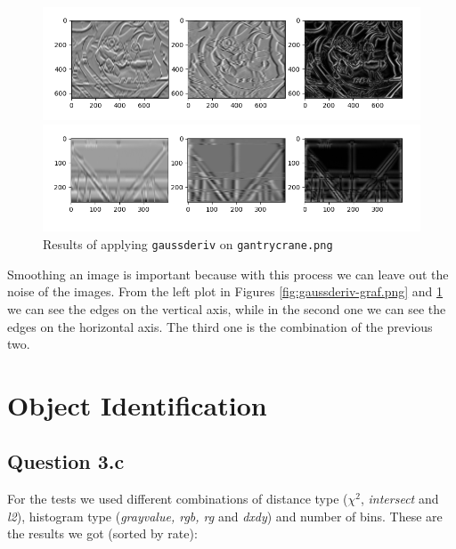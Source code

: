 \documentclass{article}
\begin{document}
\begin{figure}[ht]
    \centering
    \includegraphics[width=\textwidth]{images/Q1.e-graf-gaussderived.png}
    \cprotect\caption{Results of applying \verb|gaussderiv| on \verb|graf.png|}
    \label{fig:gaussderiv-graf.png}
    
    \includegraphics[width=\textwidth]{images/Q1.e-gantrycrane-gaussderived.png}
    \cprotect\caption{Results of applying \verb|gaussderiv| on \verb|gantrycrane.png|}
    \label{fig:gaussderiv-gantrycrane.png}
\end{figure}

\noindent
Smoothing an image is important because with this process we can leave out the noise of the images.
\newline
\newline
From the left plot in Figures \ref{fig:gaussderiv-graf.png} and \ref{fig:gaussderiv-gantrycrane.png} we can see the edges on the vertical axis, while in the second one we can see the edges on the horizontal axis. The third one is the combination of the previous two.

\newpage
\section{Object Identification}

\subsection{Question 3.c}
For the tests we used different combinations of distance type ($\chi^2$, \textit{intersect} and \textit{l2}), histogram type (\textit{grayvalue, rgb, rg} and \textit{dxdy}) and number of bins.
\newline
\newline
These are the results we got (sorted by rate):
\end{document}
